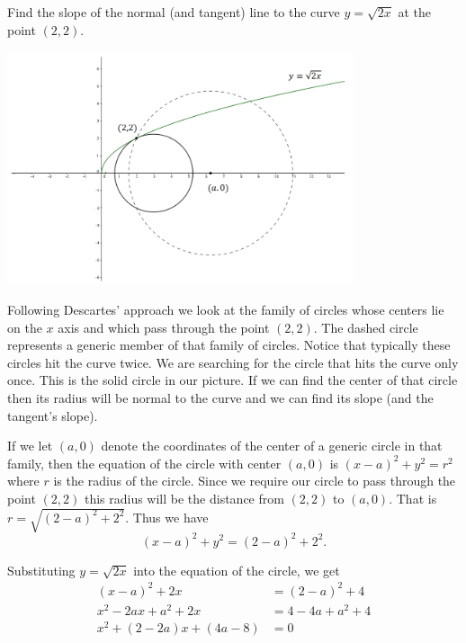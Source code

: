 \begin{myexample}
Find the slope of the normal (and tangent) line to the curve $y=\sqrt{2x}$ at the
point $(2,2).$

\centerline{\includegraphics*[height=2.7in,width=4in]{Figures/DescartesCircle}}


Following Descartes' approach we look at the family of circles whose
centers lie on the $x$ axis and which pass through the point $(2,2).$
The dashed circle represents a generic member of that family of
circles.  Notice that typically these circles hit the curve twice.  We
are searching for the circle that hits the curve only once.  This is
the solid circle in our picture.  If we can find the center of that
circle then its radius will be normal to the curve and we can find its
slope (and the tangent's slope).


If we let $(a,0)$ denote the coordinates of the center of a generic circle in that
family, then the equation of the circle with center $(a,0)$ is
$(x-a)^2+y^2=r^2$ where $r$ is the radius of the circle. Since we
require our circle to pass through the point $(2,2)$ this radius will
be the distance from $(2,2)$ to $(a,0).$ That is
$r=\sqrt{(2-a)^2+2^2}.$
Thus we have
$$
(x-a)^2+y^2=(2-a)^2+2^2.
$$

Substituting $y=\sqrt{2x}$ into the equation of the circle, we get
\begin{align*}
  (x-a)^2+2x&=(2-a)^2+4\\
  x^2-2ax+a^2+2x&=4-4a+a^2+4\\
  x^2+(2-2a)x+(4a-8)&=0
\end{align*}


\end{myexample}

